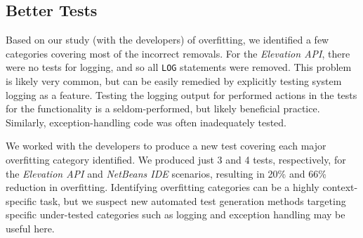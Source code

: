 \subsection{Better Tests} 
Based on our study (with the developers) of overfitting, we identified a few categories covering most of the incorrect removals. For the \textit{Elevation API}, there were no tests for logging, and so all {\tt LOG} statements were removed. This problem is likely very common, but can be easily remedied by explicitly testing system logging as a feature.  Testing the logging output for performed actions in the tests for the functionality is a seldom-performed, but likely beneficial practice.  Similarly, exception-handling code was often inadequately tested.

We worked with the developers to produce a new test covering each major overfitting category identified. We produced just 3 and 4 tests, respectively, for the \textit{Elevation API} and \textit{NetBeans IDE} scenarios, resulting in 20\% and 66\% reduction in overfitting. Identifying overfitting categories can be a highly context-specific task, but we suspect new automated test generation methods targeting specific under-tested categories such as logging and exception handling may be useful here.






